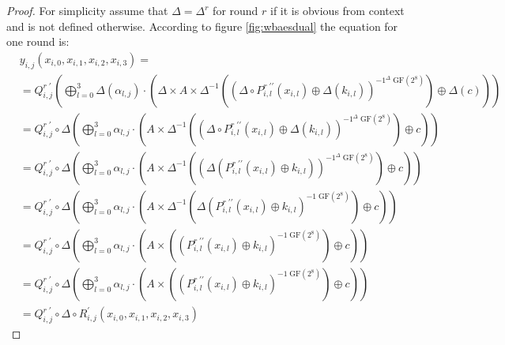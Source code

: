 \documentclass[11pt,oneside,final]{fithesis2}
\newcommand{\gfe}{\ensuremath{\text{GF}\left(2^8\right)}}
\begin{document}
\begin{proof}
	For simplicity assume that $\Delta = \Delta^r$ for round $r$ if it is obvious from context and is not defined otherwise.
	According to figure \ref{fig:wbaesdual} the equation for one round is:
	\begin{subequations} \label{eq:wb_dual_aes_r_proof}
	\begin{align} 
	& y_{i,j}\left(x_{i,0}, x_{i,1}, x_{i,2}, x_{i,3}\right) = \nonumber \\
	&= Q^{r \; \prime}_{i,j}              \left( \bigoplus^3_{l=0} \Delta(\alpha_{l,j}) \cdot \left( \Delta \times A \times \Delta^{-1} \left(               \left(\Delta \circ P^{r \; \prime\prime}_{i,l}\left(x_{i,l}\right) \oplus \Delta\left(k_{i,l}\right) \right)^{-1^{\Delta}\; \gfe} \right) \oplus \Delta \left(c\right) \right) \right) \nonumber \\ 
	&= Q^{r \; \prime}_{i,j} \circ \Delta \left( \bigoplus^3_{l=0}        \alpha_{l,j}  \cdot \left(               A \times \Delta^{-1} \left(               \left(\Delta \circ P^{r \; \prime\prime}_{i,l}\left(x_{i,l}\right) \oplus \Delta\left(k_{i,l}\right) \right)^{-1^{\Delta}\; \gfe} \right) \oplus              c        \right) \right) \nonumber \\ 
	&= Q^{r \; \prime}_{i,j} \circ \Delta \left( \bigoplus^3_{l=0}        \alpha_{l,j}  \cdot \left(               A \times \Delta^{-1} \left( \left( \Delta \left(             P^{r \; \prime\prime}_{i,l}\left(x_{i,l}\right) \oplus             k_{i,l}\right) \right)^{-1^{\Delta}\; \gfe} \right) \oplus              c        \right) \right) \label{eq:wb_dual_aes_r_proof1} \\ 
	&= Q^{r \; \prime}_{i,j} \circ \Delta \left( \bigoplus^3_{l=0}        \alpha_{l,j}  \cdot \left(               A \times \Delta^{-1} \left( \Delta        \left(             P^{r \; \prime\prime}_{i,l}\left(x_{i,l}\right) \oplus             k_{i,l}        \right)^{-1\; \gfe} \right)          \oplus              c        \right) \right) \label{eq:wb_dual_aes_r_proof2} \\
	&= Q^{r \; \prime}_{i,j} \circ \Delta \left( \bigoplus^3_{l=0}        \alpha_{l,j}  \cdot \left(               A \times             \left(               \left(             P^{r \; \prime\prime}_{i,l}\left(x_{i,l}\right) \oplus             k_{i,l}        \right)^{-1\; \gfe} \right)          \oplus              c        \right) \right) \nonumber\\
	&= Q^{r \; \prime}_{i,j} \circ \Delta \left( \bigoplus^3_{l=0}        \alpha_{l,j}  \cdot \left(               A \times             \left(               \left(             P^{r \; \prime\prime}_{i,l}\left(x_{i,l}\right) \oplus             k_{i,l}        \right)^{-1\; \gfe} \right)          \oplus              c        \right) \right) \nonumber\\
	&= Q^{r \; \prime}_{i,j} \circ \Delta \circ R_{i,j}^{\prime}\left(x_{i,0}, x_{i,1}, x_{i,2}, x_{i,3}\right) \label{eq:wb_dual_aes_r_prooffinal}
	\end{align}
	\end{subequations}


\end{proof}
\end{document}

